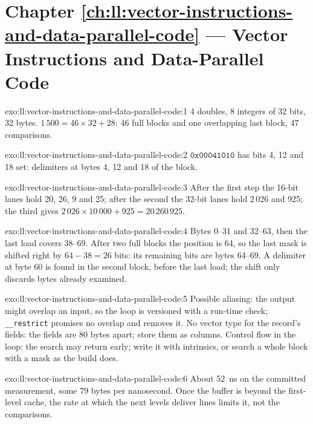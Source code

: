 \section*{Chapter \ref{ch:ll:vector-instructions-and-data-parallel-code} --- Vector Instructions and Data-Parallel Code}

\begin{solution}{exo:ll:vector-instructions-and-data-parallel-code:1}
4 doubles, 8 integers of 32 bits, 32 bytes. $1\,500 = 46 \times 32 + 28$: 46 full blocks and one overlapping last block, 47
comparisons.
\end{solution}

\begin{solution}{exo:ll:vector-instructions-and-data-parallel-code:2}
$\mathtt{0x00041010}$ has bits 4, 12 and 18 set: delimiters at bytes 4, 12 and 18 of the block.
\end{solution}

\begin{solution}{exo:ll:vector-instructions-and-data-parallel-code:3}
After the first step the 16-bit lanes hold 20, 26, 9 and 25; after the second the 32-bit lanes hold 2\,026 and 925; the third
gives $2\,026 \times 10\,000 + 925 = 20\,260\,925$.
\end{solution}

\begin{solution}{exo:ll:vector-instructions-and-data-parallel-code:4}
Bytes 0--31 and 32--63, then the last load covers 38--69. After two full blocks the position is 64, so the last mask is shifted
right by $64 - 38 = 26$ bits: its remaining bits are bytes 64--69. A delimiter at byte 60 is found in the second block, before
the last load; the shift only discards bytes already examined.
\end{solution}

\begin{solution}{exo:ll:vector-instructions-and-data-parallel-code:5}
Possible aliasing: the output might overlap an input, so the loop is versioned with a run-time check; \texttt{\_\_restrict}
promises no overlap and removes it. No vector type for the record's fields: the fields are 80 bytes apart; store them as
columns. Control flow in the loop: the search may return early; write it with intrinsics, or search a whole block with a
mask as the build does.
\end{solution}

\begin{solution}{exo:ll:vector-instructions-and-data-parallel-code:6}
About \qty{52}{\nano\second} on the committed measurement, some 79 bytes per nanosecond. Once the buffer is beyond the
first-level cache, the rate at which the next levels deliver lines limits it, not the comparisons.
\end{solution}

